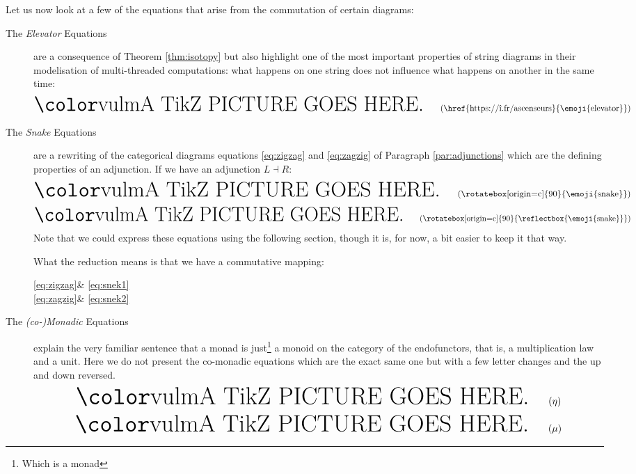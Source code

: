 Let us now look at a few of the equations that arise from the commutation of certain diagrams:
\begin{description}
	\item[The \emph{Elevator} Equations] are a consequence of Theorem \ref{thm:isotopy} but also highlight one of the most important properties of string diagrams in their modelisation of multi-threaded computations: what happens on one string does not influence what happens on another in the same time:
	      \begin{equation}
		      \inputtikz{sd-elevator}
		      \label{eq:elevator}
		      \tag{\href{https://î.fr/ascenseurs}{\emoji{elevator}}}
	      \end{equation}

	\item[The \emph{Snake} Equations] are a rewriting of the categorical diagrams equations \eqref{eq:zigzag} and \eqref{eq:zagzig} of Paragraph \ref{par:adjunctions} which are the defining properties of an adjunction.
	      If we have an adjunction $L\dashv R$:
	      \begin{equation}
		      \inputtikz{sd-snake1}
		      \tag{\rotatebox[origin=c]{90}{\emoji{snake}}}
		      \label{eq:snek1}
	      \end{equation}
	      \vspace{-12pt}
	      \begin{equation}
		      \inputtikz{sd-snake2}
		      \tag{\rotatebox[origin=c]{90}{\reflectbox{\emoji{snake}}}}
		      \label{eq:snek2}
	      \end{equation}
	      Note that we could express these equations using the following section, though it is, for now, a bit easier to keep it that way.

	      What the reduction means is that we have a commutative mapping:
	      \begin{category}[]
		      \eqref{eq:zigzag}  & \eqref{eq:snek1}  \\
		      \eqref{eq:zagzig} & \eqref{eq:snek2}
	      \end{category}
	\item[The \emph{(co-)Monadic} Equations] explain the very familiar sentence that a monad is just\footnote{Which is a monad} a monoid on the category of the endofunctors, that is, a multiplication law and a unit.
	      Here we do not present the co-monadic equations which are the exact same one but with a few letter changes and the up and down reversed.
	      \begin{equation}
		      \inputtikz{sd-monad-unit}
		      \label{eq:unitax}
		      \tag{$\eta$}
	      \end{equation}
	      \begin{equation}
		      \inputtikz{sd-monad-mult}
		      \label{eq:muax}
		      \tag{$\mu$}
	      \end{equation}
\end{description}
